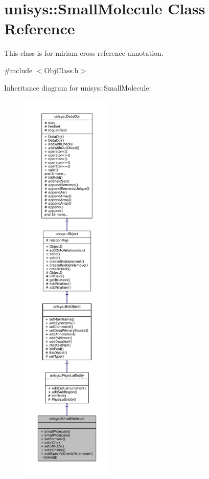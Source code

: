 \hypertarget{classunisys_1_1SmallMolecule}{\section{unisys\-:\-:Small\-Molecule Class Reference}
\label{classunisys_1_1SmallMolecule}
}


This class is for miriam cross reference annotation.  




{\ttfamily \#include $<$Obj\-Class.\-h$>$}



Inheritance diagram for unisys\-:\-:Small\-Molecule\-:
\nopagebreak
\begin{figure}[H]
\begin{center}
\leavevmode
\includegraphics[height=550pt]{classunisys_1_1SmallMolecule__inherit__graph}
\end{center}
\end{figure}


